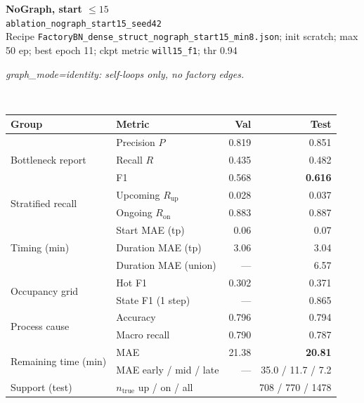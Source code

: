 \documentclass[9pt,a4paper,twocolumn]{extarticle}
\begin{document}
\noindent\begin{minipage}{\columnwidth}
\begin{center}
{\small\bfseries NoGraph, start $\le 15$}\\
{\scriptsize\texttt{ablation\_nograph\_start15\_seed42}}\\
{\scriptsize Recipe \texttt{FactoryBN\_dense\_struct\_nograph\_start15\_min8.json}; init scratch; max 50 ep; best epoch 11; ckpt metric \texttt{will15\_f1}; thr 0.94}\\[1pt]
\parbox{0.96\columnwidth}{\scriptsize\itshape graph\_mode=identity: self-loops only, no factory edges.}\\[2pt]
\scriptsize\setlength{\tabcolsep}{3pt}
\begin{tabular}{llrr}
\toprule
Group & Metric & Val & Test \\
\midrule
\multirow{3}{*}{Bottleneck report}
  & Precision $P$ & 0.819 & 0.851 \\
  & Recall $R$ & 0.435 & 0.482 \\
  & F1 & 0.568 & \textbf{0.616} \\
\midrule
\multirow{2}{*}{Stratified recall}
  & Upcoming $R_{\mathrm{up}}$ & 0.028 & 0.037 \\
  & Ongoing $R_{\mathrm{on}}$ & 0.883 & 0.887 \\
\midrule
\multirow{3}{*}{Timing (min)}
  & Start MAE (tp) & 0.06 & 0.07 \\
  & Duration MAE (tp) & 3.06 & 3.04 \\
  & Duration MAE (union) & --- & 6.57 \\
\midrule
\multirow{2}{*}{Occupancy grid}
  & Hot F1 & 0.302 & 0.371 \\
  & State F1 (1 step) & --- & 0.865 \\
\midrule
\multirow{2}{*}{Process cause}
  & Accuracy & 0.796 & 0.794 \\
  & Macro recall & 0.790 & 0.787 \\
\midrule
\multirow{2}{*}{Remaining time (min)}
  & MAE & 21.38 & \textbf{20.81} \\
  & MAE early / mid / late & --- & 35.0 / 11.7 / 7.2 \\
\midrule
Support (test)
  & $n_{\mathrm{true}}$ up / on / all & \multicolumn{2}{r}{708 / 770 / 1478} \\
\bottomrule
\end{tabular}
\end{center}
\end{minipage}\par\vspace{6pt}
\end{document}
